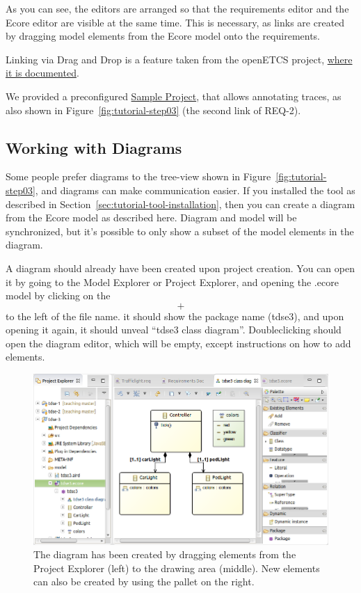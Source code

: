 As you can see, the editors are arranged so that the requirements editor and the Ecore editor are visible at the same time.  This is necessary, as links are created by dragging model elements from the Ecore model onto the requirements.

\begin{info}
Linking via Drag and Drop is a feature taken from the openETCS project, \href{https://github.com/openETCS/toolchain/wiki/User-Documentation#Tracing_Requirements_and_SysML_Models}{where it is documented}.
\end{info}

We provided a preconfigured \href{../se-materials/tutorial/tdse-3/}{Sample Project}, that allows annotating traces, as also shown in Figure~\ref{fig:tutorial-step03} (the second link of REQ-2).

\subsection{Working with Diagrams}

Some people prefer diagrams to the tree-view shown in Figure~\ref{fig:tutorial-step03}, and diagrams can make communication easier.  If you installed the tool as described in Section~\ref{sec:tutorial-tool-installation}, then you can create a diagram from the Ecore model as described here.  Diagram and model will be synchronized, but it's possible to only show a subset of the model elements in the diagram.

A diagram should already have been created upon project creation.  You can open it by going to the Model Explorer or Project Explorer, and opening the .ecore model by clicking on the \[+\] to the left of the file name. it should show the package name (tdse3), and upon opening it again, it should unveal ``tdse3 class diagram''.  Doubleclicking should open the diagram editor, which will be empty, except instructions on how to add elements.

\begin{figure}[h!]
  \centering
  \includegraphics[width=\linewidth]{../se-images/ecore_diagram.png}
  \caption{The diagram has been created by dragging elements from the Project Explorer (left) to the drawing area (middle).  New elements can also be created by using the pallet on the right.}
  \label{fig:ecore_diagram}
\end{figure}

